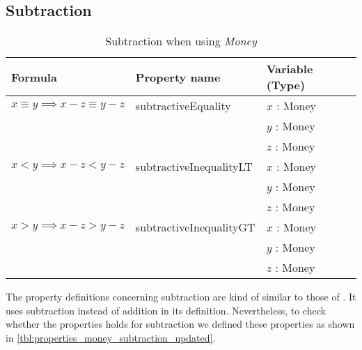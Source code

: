 \subsection*{Subtraction}
\label{ssct:properties_subtraction_updated}
\begin{table}[!ht]
\centering
\begin{tabular}{lll}
\hline
                        \textbf{Formula}                         & \textbf{Property name}  & \textbf{Variable (Type)} \\ \hline
\rowcolor[HTML]{EFEFEF} $x \equiv y \implies x - z \equiv y - z$ & subtractiveEquality     & $x$ : Money              \\
\rowcolor[HTML]{EFEFEF}                                          &                         & $y$ : Money              \\
\rowcolor[HTML]{EFEFEF}                                          &                         & $z$ : Money              \\
                        $x < y \implies x - z < y - z$           & subtractiveInequalityLT & $x$ : Money              \\
                                                                 &                         & $y$ : Money              \\
                                                                 &                         & $z$ : Money              \\
\rowcolor[HTML]{EFEFEF} $x > y \implies x - z > y - z$           & subtractiveInequalityGT & $x$ : Money              \\
\rowcolor[HTML]{EFEFEF}                                          &                         & $y$ : Money              \\
\rowcolor[HTML]{EFEFEF}                                          &                         & $z$ : Money              \\ \hline
\end{tabular}
\caption{Subtraction when using \textit{Money}}
\label{tbl:properties_money_subtraction_updated}
\end{table}
\FloatBarrier\noindent
The property definitions concerning subtraction are kind of similar to those of
. It uses subtraction instead of
addition in its definition. Nevertheless, to check whether the properties holds
for subtraction we defined these properties as shown in
\autoref{tbl:properties_money_subtraction_updated}.

